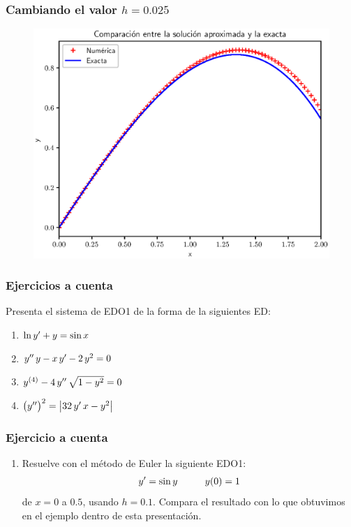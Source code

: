\documentclass[12pt]{beamer}
\begin{document}
\begin{frame}
\frametitle{Cambiando el valor $h = 0.025$}
\begin{figure}
	\centering
	\includegraphics[scale=0.55]{Imagenes/plot_euler_ejercicio_03.eps}
\end{figure}
\end{frame}
\begin{frame}
\frametitle{Ejercicios a cuenta}
Presenta el sistema de EDO1 de la forma  de la siguientes ED:
\begin{enumerate}
\item $\ln {y}^{\prime} + y = \sin x$
\item ${y}^{\prime \prime} \, y - x \, {y}^{\prime} - 2 \, y^{2} = 0$
\item ${y}^{(4)} - 4 \, {y}^{\prime \prime} \, \sqrt{1 - y^{2}} = 0$
\item $\big( {y}^{\prime \prime} \big)^{2} = \abs{ 32 \, {y}^{\prime} \, x - y^{2}}$
\seti
\end{enumerate}
\end{frame}
\begin{frame}
\frametitle{Ejercicio a cuenta}
\begin{enumerate}
\conti
\item Resuelve con el método de Euler la siguiente EDO1:
\begin{align*}
{y}^{\prime} = \sin y \hspace{1cm} y (0) = 1
\end{align*}
de $x = 0$ a $0.5$, usando $h = 0.1$. Compara el resultado con lo que obtuvimos en el ejemplo dentro de esta presentación.
\end{enumerate}
\end{frame}
\end{document}
